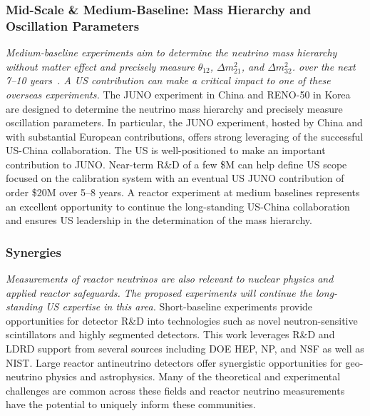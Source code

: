 \subsubsection{Mid-Scale \& Medium-Baseline: Mass Hierarchy and Oscillation Parameters}
 {\em Medium-baseline experiments aim to determine the neutrino mass
hierarchy without matter effect and precisely measure $\theta_{12}$,
$\Delta m^2_{21}$, and $\Delta m^2_{32}$. over the next 7--10
years~\cite{Kettell:2013eos}. A US contribution can make a critical
impact to one of these overseas experiments.} The JUNO experiment in
China and RENO-50 in Korea are designed to determine the neutrino mass
hierarchy and precisely measure oscillation parameters. In particular,
the JUNO experiment, hosted by China and with substantial European
contributions, offers strong leveraging of the successful US-China
collaboration. The US is well-positioned to make an important
contribution to JUNO.  Near-term R\&D of a few \$M can help define US
scope focused on the calibration system with an eventual US JUNO
contribution of order \$20M over 5--8 years.  A reactor experiment at
medium baselines represents an excellent opportunity to continue the
long-standing US-China collaboration and ensures US leadership in the
determination of the mass hierarchy.

\subsubsection{Synergies} 
{\em Measurements of reactor neutrinos are also relevant to nuclear
physics and applied reactor safeguards. The proposed experiments will
continue the long-standing US expertise in this area.} Short-baseline
experiments provide opportunities for detector R\&D into technologies
such as novel neutron-sensitive scintillators and highly segmented
detectors. This work leverages R\&D and LDRD support from several
sources including DOE HEP, NP, and NSF as well as NIST.  Large reactor
antineutrino detectors offer synergistic opportunities for
geo-neutrino physics and astrophysics. Many of the theoretical and
experimental challenges are common across these fields and reactor
neutrino measurements have the potential to uniquely inform these
communities.
